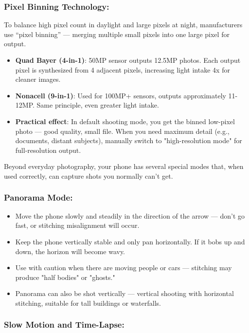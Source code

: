 \subsubsection*{Pixel Binning Technology:}

To balance high pixel count in daylight and large pixels at night, manufacturers use “pixel binning” — merging multiple small pixels into one large pixel for output.

\begin{itemize}
  \item \textbf{Quad Bayer (4-in-1)}: 50MP sensor outputs 12.5MP photos. Each output pixel is synthesized from 4 adjacent pixels, increasing light intake 4x for cleaner images.
  \item \textbf{Nonacell (9-in-1)}: Used for 100MP+ sensors, outputs approximately 11-12MP. Same principle, even greater light intake.
  \item \textbf{Practical effect}: In default shooting mode, you get the binned low-pixel photo — good quality, small file. When you need maximum detail (e.g., documents, distant subjects), manually switch to "high-resolution mode" for full-resolution output.
\end{itemize}


Beyond everyday photography, your phone has several special modes that, when used correctly, can capture shots you normally can't get.

\subsubsection*{Panorama Mode:}

\begin{itemize}
  \item Move the phone slowly and steadily in the direction of the arrow — don't go fast, or stitching misalignment will occur.
  \item Keep the phone vertically stable and only pan horizontally. If it bobs up and down, the horizon will become wavy.
  \item Use with caution when there are moving people or cars — stitching may produce "half bodies" or "ghosts."
  \item Panorama can also be shot vertically — vertical shooting with horizontal stitching, suitable for tall buildings or waterfalls.
\end{itemize}

\subsubsection*{Slow Motion and Time-Lapse:}

